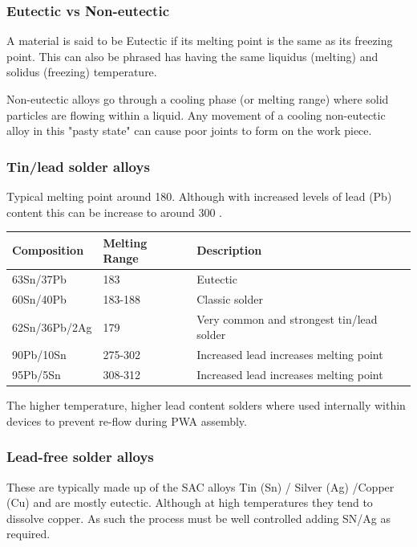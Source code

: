 \documentclass{article}
\begin{document}
		\subsubsection{Eutectic vs Non-eutectic}
		A material is said to be Eutectic if its melting point is the same as its freezing point. 
		This can also be phrased has having the same liquidus (melting) and solidus (freezing) temperature.
		
		Non-eutectic alloys go through a cooling phase (or melting range) where solid particles are flowing within a liquid. Any movement of a cooling non-eutectic alloy in this "pasty state" can cause poor joints to form on the work piece.  		
	
		\subsubsection{Tin/lead solder alloys}	 
		 Typical melting point around 180\degree .
		 Although with increased levels of lead (Pb) content this can be increase to around 300 \degree .
		\begin{center}
 			\begin{tabular}{| m{10em} | m{5em}| m{17em} | } 
 			\hline
 			\textbf{Composition} & \textbf{Melting Range} & \textbf{Description} \\ [0.5ex] 
 			\hline\hline
 			63Sn/37Pb & 183\degree & Eutectic  \\ 
 			\hline
 			60Sn/40Pb & 183-188\degree & Classic solder \\
 			\hline
 			62Sn/36Pb/2Ag & 179\degree & Very common and strongest tin/lead solder \\
 			\hline
 			90Pb/10Sn & 275-302\degree & Increased lead increases melting point \\
 			\hline
 			95Pb/5Sn & 308-312\degree & Increased lead increases melting point \\
 			\hline
			\end{tabular}
		\end{center}
The higher temperature, higher lead content solders where used internally within devices to prevent re-flow during PWA assembly.
				
		\subsubsection{Lead-free solder alloys}
		These are typically made up of the SAC alloys Tin (Sn) / Silver (Ag) /Copper (Cu) and are mostly eutectic. 
		Although at high temperatures they tend to dissolve copper. 
		As such the process must be well controlled adding SN/Ag as required.
				
\end{document}
